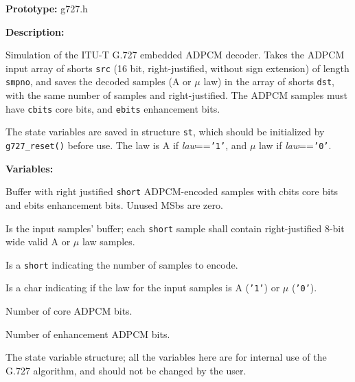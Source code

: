 {\bf Prototype: }    g727.h

{\bf Description: }

Simulation of the ITU-T G.727 embedded ADPCM decoder. Takes the ADPCM
input array of shorts {\tt src} (16 bit, right-justified, without sign
extension) of length {\tt smpno}, and saves the decoded samples (A or
$\mu$ law) in the array of shorts {\tt dst}, with the same number of
samples and right-justified. The ADPCM samples must have {\tt cbits}
core bits, and {\tt ebits} enhancement bits.

The state variables are saved in structure {\tt st}, which should be
initialized by {\tt g727\_reset()} before use. The law is A if {\em
law}=={\tt '1'}, and $\mu$ law if {\em law}=={\tt '0'}.

{\bf Variables: }
\begin{Descr}{\DescrLen}
\item[\pbox{20mm}{\em src}] %
               Buffer with right justified {\tt short} ADPCM-encoded
               samples with cbits core bits and ebits enhancement
               bits. Unused MSbs are zero.

\item[\pbox{20mm}{\em dst}] %
               Is the input samples' buffer; each {\tt short} sample
               shall contain right-justified 8-bit wide valid A or $\mu$
               law samples.

\item[\pbox{20mm}{\em smpno}] %
               Is a {\tt short} indicating the number of samples to encode.

\item[\pbox{20mm}{\em law}] %
               Is a char indicating if the law for the input samples is A
               ({\tt '1'}) or $\mu$ ({\tt '0'}).

\item[\pbox{20mm}{\em cbits}] %
               Number of core ADPCM bits.

\item[\pbox{20mm}{\em ebits}] %
               Number of enhancement ADPCM bits.

\item[\pbox{20mm}{\em state}] %
               The state variable structure; all the variables here are for
               internal use of the G.727 algorithm, and should not be
               changed by the user.
\end{Descr}



